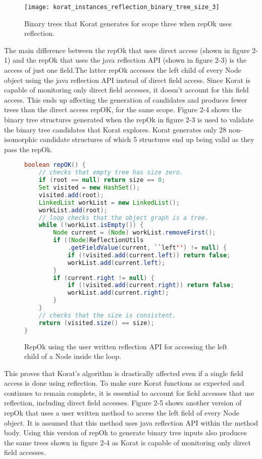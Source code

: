 \begin{figure}
\centering
\texttt{[image: korat\_instances\_reflection\_binary\_tree\_size\_3]}
\label{fig:btreeReflectKoratGenScopeThree}
\caption{ Binary trees that Korat generates for scope three when repOk uses reflection.}
\end{figure}

\par
The main difference between the repOk that uses direct access (shown in figure 2-1) and the repOk that uses the java reflection API (shown in figure 2-3) is the access of just one field.The latter repOk accesses the left child of every Node object using the java reflection API instead of direct field access. Since Korat is capable of monitoring only direct field accesses, it doesn’t account for this field access. This ends up affecting the generation of candidates and produces fewer trees than the direct access repOK, for the same scope. Figure 2-4 shows the binary tree structures generated when the repOk in figure 2-3 is used to validate the binary tree candidates that Korat explores. Korat generates only 28 non-isomorphic candidate structures of which 5 structures end up being valid as they pass the repOk.

\begin{figure}
\centering
\begin{lstlisting}[language=Java]
boolean repOK() {
    // checks that empty tree has size zero.
    if (root == null) return size == 0;
    Set visited = new HashSet();
    visited.add(root);
    LinkedList workList = new LinkedList();
    workList.add(root);
    // loop checks that the object graph is a tree.
    while (!workList.isEmpty()) {
        Node current = (Node) workList.removeFirst();
        if ((Node)ReflectionUtils
            .getFieldValue(current, ``left'') != null) {
            if (!visited.add(current.left)) return false;
            workList.add(current.left);
        }
        if (current.right != null) {
            if (!visited.add(current.right)) return false;
            workList.add(current.right);
        }
    }
    // checks that the size is consistent.
    return (visited.size() == size);
}
\end{lstlisting}
\caption{RepOk using the user written reflection API for accessing the left child of a Node inside the loop.}
\label{fig:btTreeUserReflectionRepOK}
\end{figure}

\par
This proves that Korat’s algorithm is drastically affected even if a single field access is done using reflection. To make sure Korat functions as expected and continues to remain complete, it is essential to account for field accesses that use reflection, including direct field accesses. Figure 2-5 shows another version of repOk that uses a user written method to access the left field of every Node object. It is assumed that this method uses java reflection API within the method body. Using this version of repOk to generate binary tree inputs also produces the same trees shown in figure 2-4 as Korat is capable of monitoring only direct field accesses. 


